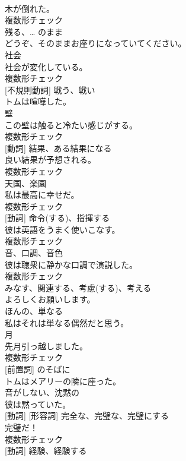 \documentclass[8pt]{extreport}
\begin{document}
\begin{CJK}{UTF8}{min}
\\	木が倒れた。	
\\	複数形チェック
\\	[動詞]	残る、… のまま	
\\	どうぞ、そのままお座りになっていてください。	
\\	[名詞]	社会	
\\	社会が変化している。	
\\	複数形チェック
\\	[動詞] [不規則動詞]	戦う、戦い	
\\	トムは喧嘩した。	
\\	[名詞]	壁	
\\	この壁は触ると冷たい感じがする。	
\\	複数形チェック
\\	[名詞] [動詞]	結果、ある結果になる	
\\	良い結果が予想される。	
\\	複数形チェック
\\	[名詞]	天国、楽園	
\\	私は最高に幸せだ。	
\\	複数形チェック
\\	[名詞] [動詞]	命令(する)、指揮する	
\\	彼は英語をうまく使いこなす。	
\\	複数形チェック
\\	[名詞]	音、口調、音色	
\\	彼は聴衆に静かな口調で演説した。	
\\	複数形チェック
\\	[動詞]	みなす、関連する、考慮(する)、考える	
\\	よろしくお願いします。	
\\	[形容詞]	ほんの、単なる	
\\	私はそれは単なる偶然だと思う。	
\\	[名詞]	月	
\\	先月引っ越しました。	
\\	複数形チェック
\\	[副詞] [前置詞]	のそばに	
\\	トムはメアリーの隣に座った。	
\\	[形容詞]	音がしない、沈黙の	
\\	彼は黙っていた。	
\\	[名詞] [動詞] [形容詞]	完全な、完璧な、完璧にする	
\\	完璧だ！	
\\	複数形チェック
\\	[名詞] [動詞]	経験、経験する	

\end{CJK}
\end{document}
